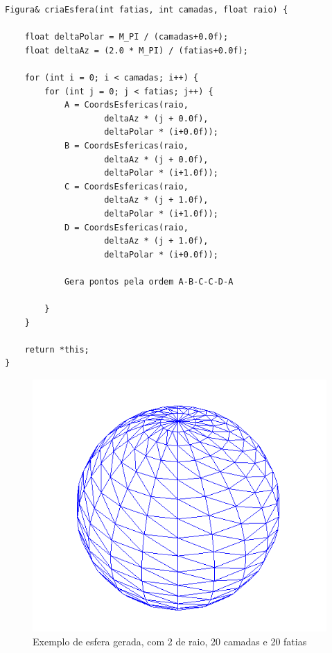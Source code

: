 \begin{Verbatim}
Figura& criaEsfera(int fatias, int camadas, float raio) {
	
	float deltaPolar = M_PI / (camadas+0.0f);
	float deltaAz = (2.0 * M_PI) / (fatias+0.0f);
	
	for (int i = 0; i < camadas; i++) {
		for (int j = 0; j < fatias; j++) {
			A = CoordsEsfericas(raio, 
					deltaAz * (j + 0.0f), 
					deltaPolar * (i+0.0f));
			B = CoordsEsfericas(raio,
					deltaAz * (j + 0.0f), 
					deltaPolar * (i+1.0f));
			C = CoordsEsfericas(raio,
					deltaAz * (j + 1.0f),
					deltaPolar * (i+1.0f));
			D = CoordsEsfericas(raio,
					deltaAz * (j + 1.0f),
					deltaPolar * (i+0.0f));
			
			Gera pontos pela ordem A-B-C-C-D-A
			
		}
	}
	
	return *this;
}
\end{Verbatim}

\begin{figure}[<+htpb+>]
	\centering
	\includegraphics[scale=0.5]{imagens/p3_esfera_2_20_20.png}
	\caption{Exemplo de esfera gerada, com 2 de raio, 20 camadas e 20 fatias}
	\label{p1:fig:p3_esfera_2_20_20}
\end{figure}

